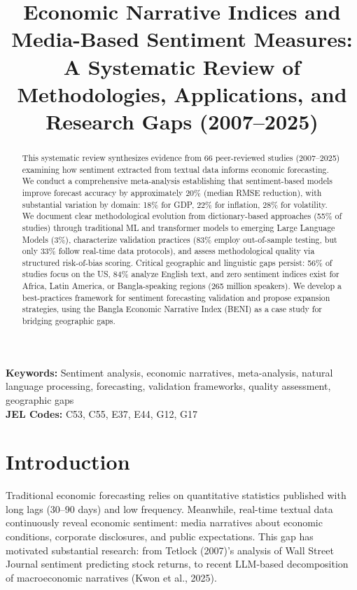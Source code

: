 \documentclass[11pt]{article}
\title{\textbf{Economic Narrative Indices and Media-Based Sentiment Measures:\\
A Systematic Review of Methodologies, Applications, and Research Gaps (2007--2025)}}
\author{} %
\date{}
\begin{document}
\maketitle

\begin{abstract}
This systematic review synthesizes evidence from 66 peer-reviewed studies (2007--2025) examining how sentiment extracted from textual data informs economic forecasting. We conduct a comprehensive meta-analysis establishing that sentiment-based models improve forecast accuracy by approximately 20\% (median RMSE reduction), with substantial variation by domain: 18\% for GDP, 22\% for inflation, 28\% for volatility. We document clear methodological evolution from dictionary-based approaches (55\% of studies) through traditional ML and transformer models to emerging Large Language Models (3\%), characterize validation practices (83\% employ out-of-sample testing, but only 33\% follow real-time data protocols), and assess methodological quality via structured risk-of-bias scoring. Critical geographic and linguistic gaps persist: 56\% of studies focus on the US, 84\% analyze English text, and zero sentiment indices exist for Africa, Latin America, or Bangla-speaking regions (265 million speakers). We develop a best-practices framework for sentiment forecasting validation and propose expansion strategies, using the Bangla Economic Narrative Index (BENI) as a case study for bridging geographic gaps.
\end{abstract}

\noindent \textbf{Keywords:} Sentiment analysis, economic narratives, meta-analysis, natural language processing, forecasting, validation frameworks, quality assessment, geographic gaps \\
\textbf{JEL Codes:} C53, C55, E37, E44, G12, G17

\section{Introduction}

Traditional economic forecasting relies on quantitative statistics published with long lags (30--90 days) and low frequency. Meanwhile, real-time textual data continuously reveal economic sentiment: media narratives about economic conditions, corporate disclosures, and public expectations. This gap has motivated substantial research: from Tetlock (2007)'s analysis of Wall Street Journal sentiment predicting stock returns, to recent LLM-based decomposition of macroeconomic narratives (Kwon et al., 2025).
\end{document}
